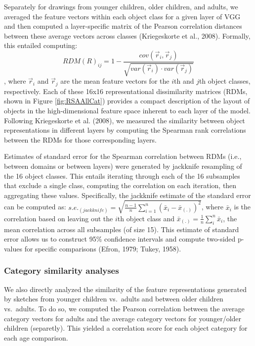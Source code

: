 \documentclass[10pt, letterpaper]{article}
\begin{document}
Separately for drawings from younger children, older children, and
adults, we averaged the feature vectors within each object class for a
given layer of VGG and then computed a layer-specific matrix of the
Pearson correlation distances between these average vectors across
classes (Kriegeskorte et al., 2008). Formally, this entailed computing:
\[RDM(R)_{ij} = 1- \frac{cov(\vec{r}_{i}, \vec{r}_{j})}{\sqrt{var(\vec{r}_{i}) \cdot var(\vec{r}_{j})}}\],
where \(\vec{r}_{i}\) and \(\vec{r}_{j}\) are the mean feature vectors
for the \(i\)th and \(j\)th object classes, respectively. Each of these
16x16 representational dissimilarity matrices (RDMs, shown in Figure
\ref{fig:RSAAllCat}) provides a compact description of the layout of
objects in the high-dimensional feature space inherent to each layer of
the model. Following Kriegeskorte et al. (2008), we measured the
similarity between object representations in different layers by
computing the Spearman rank correlations between the RDMs for those
corresponding layers.

Estimates of standard error for the Spearman correlation between RDMs
(i.e., between domains or between layers) were generated by jackknife
resampling of the 16 object classes. This entails iterating through each
of the 16 subsamples that exclude a single class, computing the
correlation on each iteration, then aggregating these values.
Specifically, the jackknife estimate of the standard error can be
computed as:
\(s.e._{(jackknife)} = \sqrt{\frac{n-1}{n} \sum_{i=1}^{n} (\bar{x}_{i} - \bar{x}_{(.)})^{2}}\),
where \(\bar{x}_{i}\) is the correlation based on leaving out the
\(i\)th object class and
\(\bar{x}_{(.)} = \frac{1}{n} \sum_{i}^{n} \bar{x}_{i}\), the mean
correlation across all subsamples (of size 15). This estimate of
standard error allows us to construct 95\% confidence intervals and
compute two-sided p-values for specific comparisons (Efron, 1979; Tukey,
1958).

\subsubsection{Category similarity
analyses}\label{category-similarity-analyses}

We also directly analyzed the similarity of the feature representations
generated by sketches from younger children vs.~adults and between older
children vs.~adults. To do so, we computed the Pearson correlation
between the average category vectors for adults and the average category
vectors for younger/older children (separetly). This yielded a
correlation score for each object category for each age comparison.
\end{document}
